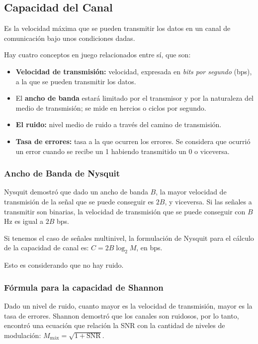 \documentclass[10pt,a4paper]{article}
\begin{document}
\subsection{Capacidad del Canal}
Es la velocidad máxima que se pueden transmitir los datos en un canal de comunicación bajo unos condiciones dadas.

Hay cuatro conceptos en juego relacionados entre sí, que son:
\begin{itemize}
\item \textbf{Velocidad de transmisión:} velocidad, expresada en \textit{bits por segundo} (bps), a la que se pueden transmitir los datos.
\item El \textbf{ancho de banda} estará limitado por el transmisor y por la naturaleza del medio de transmisión; se mide en hercios o ciclos por segundo.
\item \textbf{El ruido:} nivel medio de ruido a través del camino de transmisión.
\item \textbf{Tasa de errores:} tasa a la que ocurren los errores. Se considera que ocurrió un error cuando se recibe un 1 habiendo transmitido un 0 o viceversa.
\end{itemize}

\subsubsection{Ancho de Banda de Nysquit}
Nysquit demostró que dado un ancho de banda $B$, la mayor velocidad de transmisión de la señal que se puede conseguir es $2B$, y viceversa. Si las señales a transmitir son binarias, la velocidad de transmisión que se puede conseguir con $B$ Hz es igual a $2B$ bps.

Si tenemos el caso de señales multinivel, la formulación de Nysquit para el cálculo de la capacidad de canal es: $C=2B \log_2 M$, en bps.

Esto es considerando que no hay ruido.

\subsubsection{Fórmula para la capacidad de Shannon}

Dado un nivel de ruido, cuanto mayor es la velocidad de transmisión, mayor es la tasa de errores. Shannon demostró que los canales son ruidosos, por lo tanto, encontró una ecuación que relación la SNR con la cantidad de niveles de modulación: $M_\text{máx}=\sqrt{1+\text{SNR}}$.
\end{document}
